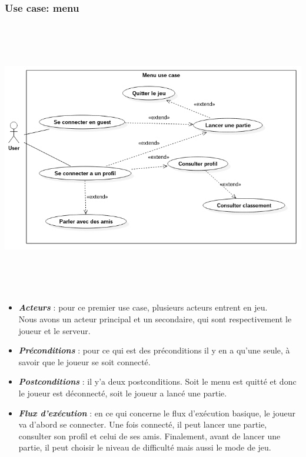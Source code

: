 \documentclass[10pt,a4paper]{article}
\begin{document}
\subsubsection{Use case: menu}
\begin{center}
    \includegraphics[height=12cm,width=16.45cm]{menu_use_case.png}
\end{center}
\par
\begin{itemize}
\item \textit{\textbf{Acteurs}} : pour ce premier use case, plusieurs acteurs entrent en jeu.\\
	Nous avons un acteur principal et un secondaire, qui sont respectivement le \gls{joueur} et le \gls{serveur}.\\

\item \textit{\textbf{Préconditions}} :  pour ce qui est des préconditions il y en a qu'une seule, à savoir que le \gls{joueur} se soit connecté.\\

\item \textit{\textbf{Postconditions}} : il y'a deux postconditions. Soit le menu est quitté et donc le \gls{joueur} est déconnecté, soit le \gls{joueur} a lancé une partie.\\

\item \textit{\textbf{Flux d'exécution}} : en ce qui concerne le flux d'exécution basique, le \gls{joueur} va d'abord se connecter. Une fois connecté, il peut lancer une partie, consulter son profil et celui de ses amis. Finalement, avant de lancer une partie, il peut choisir le niveau de difficulté mais aussi le mode de jeu.

\end{itemize}    
\end{document}
